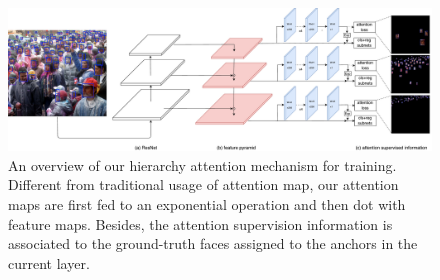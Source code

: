 \documentclass[10pt,twocolumn,letterpaper]{article}
\begin{document}
\begin{figure}[h]
\begin{center}
    \includegraphics[width=0.9\linewidth]{attention.pdf}
\end{center}
    \caption{An overview of our hierarchy attention mechanism for training. Different from traditional usage of attention map, our attention maps are first fed to an exponential operation and then dot with feature maps. Besides, the attention supervision information is associated to the ground-truth faces assigned to the anchors in the current layer.}
\label{fig:hierarchy_attetion}
\end{figure}
\end{document}
